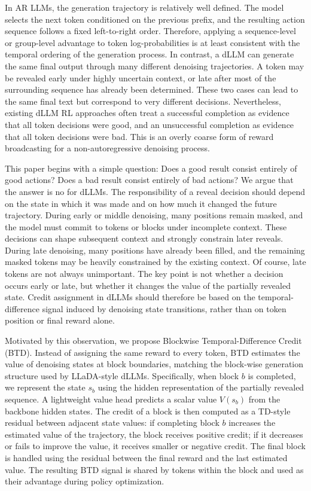 \documentclass[letterpaper]{article}
\begin{document}
In AR LLMs, the generation trajectory is relatively well defined. The model selects the next token conditioned on the previous prefix, and the resulting action sequence follows a fixed left-to-right order. Therefore, applying a sequence-level or group-level advantage to token log-probabilities is at least consistent with the temporal ordering of the generation process. In contrast, a dLLM can generate the same final output through many different denoising trajectories. A token may be revealed early under highly uncertain context, or late after most of the surrounding sequence has already been determined. These two cases can lead to the same final text but correspond to very different decisions. Nevertheless, existing dLLM RL approaches often treat a successful completion as evidence that all token decisions were good, and an unsuccessful completion as evidence that all token decisions were bad. This is an overly coarse form of reward broadcasting for a non-autoregressive denoising process.

This paper begins with a simple question: Does a good result consist entirely of good actions? Does a bad result consist entirely of bad actions? We argue that the answer is no for dLLMs. The responsibility of a reveal decision should depend on the state in which it was made and on how much it changed the future trajectory. During early or middle denoising, many positions remain masked, and the model must commit to tokens or blocks under incomplete context. These decisions can shape subsequent context and strongly constrain later reveals. During late denoising, many positions have already been filled, and the remaining masked tokens may be heavily constrained by the existing context. Of course, late tokens are not always unimportant. The key point is not whether a decision occurs early or late, but whether it changes the value of the partially revealed state. Credit assignment in dLLMs should therefore be based on the temporal-difference signal induced by denoising state transitions, rather than on token position or final reward alone.

Motivated by this observation, we propose Blockwise Temporal-Difference Credit (BTD). Instead of assigning the same reward to every token, BTD estimates the value of denoising states at block boundaries, matching the block-wise generation structure used by LLaDA-style dLLMs. Specifically, when block $b$ is completed, we represent the state $s_b$ using the hidden representation of the partially revealed sequence. A lightweight value head predicts a scalar value $V(s_b)$ from the backbone hidden states. The credit of a block is then computed as a TD-style residual between adjacent state values: if completing block $b$ increases the estimated value of the trajectory, the block receives positive credit; if it decreases or fails to improve the value, it receives smaller or negative credit. The final block is handled using the residual between the final reward and the last estimated value. The resulting BTD signal is shared by tokens within the block and used as their advantage during policy optimization.
\end{document}
